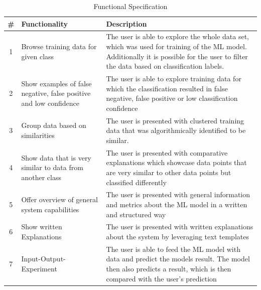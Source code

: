 \documentclass[11pt,a4paper,english]{scrreprt}
\begin{document}
\begin{table}[htbp]
    \centering
    \begin{tabularx}{\textwidth}{ c X X }
        \toprule
        \# & Functionality & Description \\
        \midrule
        1 & Browse training data for given class & The user is able to explore the whole data set, which was used for training of the ML model. Additionally it is possible for the user to filter the data based on classification labels. \\ 
        2 & Show examples of false negative, false positive and low confidence & The user is able to explore training data for which the classification resulted in false negative, false positive or low classification confidence \\  
        3 & Group data based on similarities & The user is presented with clustered training data that was algorithmically identified to be similar. \\
        4 & Show data that is very similar to data from another class & The user is presented with comparative explanations which showcase data points that are very similar to other data points but classified differently \\
        5 & Offer overview of general system capabilities & The user is presented with general information and metrics about the ML model in a written and structured way \\
        6 & Show written Explanations & The user is presented with written explanations about the system by leveraging text templates \\
        7 & Input-Output-Experiment & The user is able to feed the ML model with data and predict the models result. The model then also predicts a result, which is then compared with the user's prediction \\
        \bottomrule
    \end{tabularx}
    \caption{Functional Specification}
    \label{table:function_specification}
\end{table}
\end{document}

